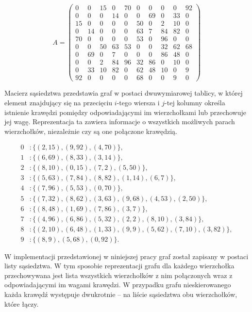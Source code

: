 \begin{equation}
\label{eq:adjacency_matrix}
A =
\begin{pmatrix}
0  & 0  & 15 & 0  & 70 & 0  & 0  & 0  & 0  & 92 \\
0  & 0  & 0  & 14 & 0  & 0  & 69 & 0  & 33 & 0  \\
15 & 0  & 0  & 0  & 0  & 50 & 0  & 2  & 10 & 0  \\
0  & 14 & 0  & 0  & 0  & 63 & 7  & 84 & 82 & 0  \\
70 & 0  & 0  & 0  & 0  & 53 & 0  & 96 & 0  & 0  \\
0  & 0  & 50 & 63 & 53 & 0  & 0  & 32 & 62 & 68 \\
0  & 69 & 0  & 7  & 0  & 0  & 0  & 86 & 48 & 0  \\
0  & 0  & 2  & 84 & 96 & 32 & 86 & 0  & 10 & 0  \\
0  & 33 & 10 & 82 & 0  & 62 & 48 & 10 & 0  & 9  \\
92 & 0  & 0  & 0  & 0  & 68 & 0  & 0  & 9  & 0
\end{pmatrix}
\end{equation}

Macierz sąsiedztwa przedstawia graf w postaci dwuwymiarowej tablicy, w której element znajdujący się na przecięciu \(i\)-tego wiersza i \(j\)-tej kolumny określa istnienie krawędzi pomiędzy odpowiadającymi im wierzchołkami lub przechowuje jej wagę. Reprezentacja ta zawiera informacje o wszystkich możliwych parach wierzchołków, niezależnie czy są one połączone krawędzią.

\begin{equation}
\label{eq:adjacency_list}
\begin{aligned}
0 &: \{(2,15), (9,92), (4,70)\}, \\
1 &: \{(6,69), (8,33), (3,14)\}, \\
2 &: \{(8,10), (0,15), (7,2), (5,50)\}, \\
3 &: \{(5,63), (7,84), (8,82), (1,14), (6,7)\}, \\
4 &: \{(7,96), (5,53), (0,70)\}, \\
5 &: \{(7,32), (8,62), (3,63), (9,68), (4,53), (2,50)\}, \\
6 &: \{(8,48), (1,69), (7,86), (3,7)\}, \\
7 &: \{(4,96), (6,86), (5,32), (2,2), (8,10), (3,84)\}, \\
8 &: \{(2,10), (6,48), (1,33), (9,9), (5,62), (7,10), (3,82)\}, \\
9 &: \{(8,9), (5,68), (0,92)\}.
\end{aligned}
\end{equation}

W implementacji przedstawionej w niniejszej pracy graf został zapisany w postaci listy sąsiedztwa. W tym sposobie reprezentacji grafu dla każdego wierzchołka przechowywana jest lista wszystkich wierzchołków z nim połączonych wraz z odpowiadającymi im wagami krawędzi. W przypadku grafu nieskierowanego każda krawędź występuje dwukrotnie – na liście sąsiedztwa obu wierzchołków, które łączy.
